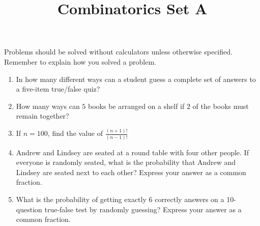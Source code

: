 \documentclass{article}
\title{Combinatorics Set A}
\author{}
\date{}
\begin{document}
    \maketitle
    \noindent Problems should be solved without calculators unless otherwise specified.
    Remember to explain how you solved a problem.
    \begin{enumerate}
        \item In how many different ways can a student guess a complete set of answers to a
        five-item true/false quiz?
        \vspace{3cm}
        \item How many ways can $5$ books be arranged on a shelf if $2$ of the books must
        remain together?
        \vspace{3cm}
        \item If $n = 100$, find the value of $\frac{(n+1)!}{(n-1)!}$
        \pagebreak
        \item Andrew and Lindsey are seated at a round table with four other people. If everyone
        is randomly seated, what is the probability that Andrew and Lindsey are seated next to
        each other? Express your answer as a common fraction.
        \vspace{3cm}
        \item What is the probability of getting exactly $6$ correctly answers on a 10-question
        true-false test by randomly guessing? Express your answer as a common fraction.
        \vspace{3cm}
    \end{enumerate}
\end{document}
